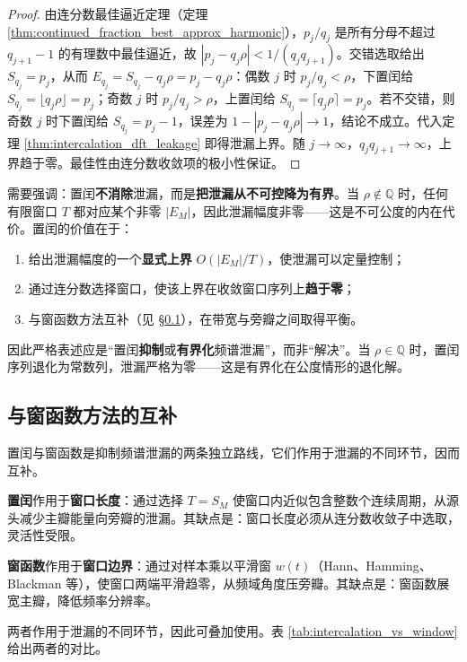 \begin{proof}
由连分数最佳逼近定理（定理 \ref{thm:continued_fraction_best_approx_harmonic}），\(p_j/q_j\) 是所有分母不超过 \(q_{j+1}-1\) 的有理数中最佳逼近，故 \(|p_j-q_j\rho|<1/(q_j q_{j+1})\)。交错选取给出 \(S_{q_j}=p_j\)，从而 \(E_{q_j}=S_{q_j}-q_j\rho=p_j-q_j\rho\)：偶数 \(j\) 时 \(p_j/q_j<\rho\)，下置闰给 \(S_{q_j}=\lfloor q_j\rho\rfloor=p_j\)；奇数 \(j\) 时 \(p_j/q_j>\rho\)，上置闰给 \(S_{q_j}=\lceil q_j\rho\rceil=p_j\)。若不交错，则奇数 \(j\) 时下置闰给 \(S_{q_j}=p_j-1\)，误差为 \(1-|p_j-q_j\rho|\to1\)，结论不成立。代入定理 \ref{thm:intercalation_dft_leakage} 即得泄漏上界。随 $j\to\infty$，$q_jq_{j+1}\to\infty$，上界趋于零。最佳性由连分数收敛项的极小性保证。
\end{proof}

\begin{remark}[“有界化”而非“消除”]\label{rem:bounded_not_eliminated}
需要强调：置闰\textbf{不消除}泄漏，而是\textbf{把泄漏从不可控降为有界}。当 $\rho\notin\mathbb{Q}$ 时，任何有限窗口 $T$ 都对应某个非零 $|E_M|$，因此泄漏幅度非零——这是不可公度的内在代价。置闰的价值在于：
\begin{enumerate}[label=(\roman*)]
    \item 给出泄漏幅度的一个\textbf{显式上界} $O(|E_M|/T)$，使泄漏可以定量控制；
    \item 通过连分数选择窗口，使该上界在收敛窗口序列上\textbf{趋于零}；
    \item 与窗函数方法互补（见 \S \ref{subsec:intercalation_vs_window}），在带宽与旁瓣之间取得平衡。
\end{enumerate}
因此严格表述应是“置闰\textbf{抑制}或\textbf{有界化}频谱泄漏”，而非“解决”。当 $\rho\in\mathbb{Q}$ 时，置闰序列退化为常数列，泄漏严格为零——这是有界化在公度情形的退化解。
\end{remark}

\subsection{与窗函数方法的互补}\label{subsec:intercalation_vs_window}

置闰与窗函数是抑制频谱泄漏的两条独立路线，它们作用于泄漏的不同环节，因而互补。

\begin{remark}[两条路线的分工]\label{rem:two_routes_division}
\textbf{置闰}作用于\textbf{窗口长度}：通过选择 $T=S_M$ 使窗口内近似包含整数个连续周期，从源头减少主瓣能量向旁瓣的泄漏。其缺点是：窗口长度必须从连分数收敛子中选取，灵活性受限。

\textbf{窗函数}作用于\textbf{窗口边界}：通过对样本乘以平滑窗 $w(t)$（Hann、Hamming、Blackman 等），使窗口两端平滑趋零，从频域角度压旁瓣。其缺点是：窗函数展宽主瓣，降低频率分辨率。

两者作用于泄漏的不同环节，因此可叠加使用。表 \ref{tab:intercalation_vs_window} 给出两者的对比。
\end{remark}


